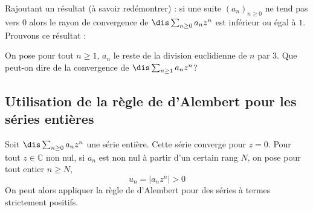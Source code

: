 \documentclass[a4paper,10pt]{report}
\begin{document}
%
%

\begin{rem} Rajoutant un résultat (à savoir redémontrer) : si une suite $(a_n)_{n \geq 0}$ ne tend pas vers $0$ alors le rayon de convergence de $\dis \sum_{n \geq 0} a_n z^n$ est inférieur ou égal à $1$. Prouvons ce résultat : 

\vspace{2cm}
\end{rem}

\begin{ex} On pose pour tout $n \geq 1$, $a_n$ le reste de la division euclidienne de $n$ par $3$. Que peut-on dire de la convergence de $\dis \sum_{n \geq 1} a_n z^n$?

\vspace{3cm}
\end{ex}

\subsection{Utilisation de la règle de d'Alembert pour les séries entières}
\noindent Soit $\dis \sum_{n \geq 0} a_n z^n$ une série entière. Cette série converge pour $z=0$. Pour tout $z \in \mathbb{C}$ non nul, si $a_n$ est non nul à partir d'un certain rang $N$, on pose pour tout entier $n \geq N$,
$$ u_n = \vert a_n z^n \vert >0$$
On peut alors appliquer la règle de d'Alembert pour des séries à termes strictement positifs.

\medskip

%
\end{document}
